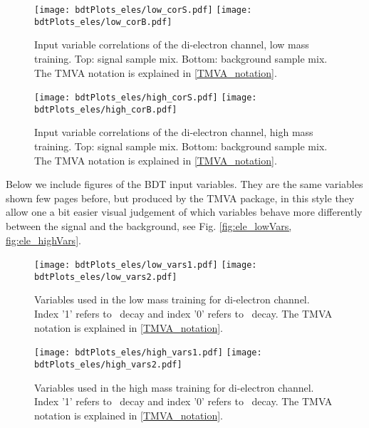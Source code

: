 \begin{figure}[tbp]
  \begin{center}
   \texttt{[image: bdtPlots\_eles/low\_corS.pdf]}
   \texttt{[image: bdtPlots\_eles/low\_corB.pdf]}
    \caption[Input variable correlations of the di-electron channel, low mass training.]{ Input variable correlations of the di-electron channel, low mass training. Top: signal sample mix. Bottom: background sample mix. The TMVA notation is explained in \ref{TMVA_notation}.}
    \label{fig:ele_cors_low}
  \end{center}
\end{figure}

\begin{figure}[tbp]
  \begin{center}
   \texttt{[image: bdtPlots\_eles/high\_corS.pdf]}
   \texttt{[image: bdtPlots\_eles/high\_corB.pdf]}
    \caption[Input variable correlations of the di-electron channel, high mass training.]{ Input variable correlations of the di-electron channel, high mass training. Top: signal sample mix. Bottom: background sample mix. The TMVA notation is explained in \ref{TMVA_notation}.}
    \label{fig:ele_cors_high}
  \end{center}
\end{figure}
    
Below we include figures of the BDT input variables. They are the same variables shown few pages before, but produced by the TMVA package, in this style they allow one a bit easier visual judgement of which variables behave more differently between the signal and the background, see Fig. \ref{fig:ele_lowVars, fig:ele_highVars}.

\begin{figure}[H]
  \begin{center}
   \texttt{[image: bdtPlots\_eles/low\_vars1.pdf]}
   \texttt{[image: bdtPlots\_eles/low\_vars2.pdf]}
    \caption[Variables used in the low mass training for di-electron channel.]{ Variables used in the low mass training for di-electron channel. Index '1' refers to \HBB~decay and index '0' refers to \HZZ~decay. The TMVA notation is explained in \ref{TMVA_notation}.}
    \label{fig:ele_lowVars}
  \end{center}
\end{figure}

\begin{figure}[H]
  \begin{center}
   \texttt{[image: bdtPlots\_eles/high\_vars1.pdf]}
   \texttt{[image: bdtPlots\_eles/high\_vars2.pdf]}
    \caption[Variables used in the high mass training for di-electron channel.]{ Variables used in the high mass training for di-electron channel. Index '1' refers to \HBB~decay and index '0' refers to \HZZ~decay. The TMVA notation is explained in \ref{TMVA_notation}.}
    \label{fig:ele_highVars}
  \end{center}
\end{figure}

